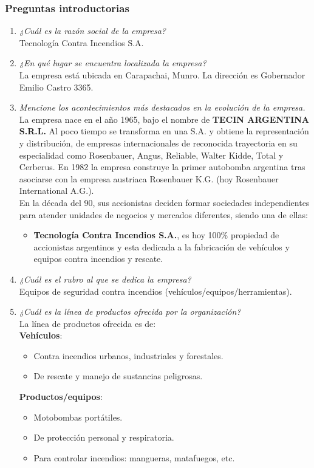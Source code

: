 \documentclass[a4paper,10pt]{article}
\begin{document}
		\subsubsection{Preguntas introductorias}
			\begin{enumerate}
				\item \textit{¿Cuál es la razón social de la empresa?}\\
				Tecnología Contra Incendios S.A.
				
				\item \textit{¿En qué lugar se encuentra localizada la empresa?}\\
				La empresa está ubicada en Carapachai, Munro. La dirección es Gobernador Emilio Castro 3365.			
				
				\item \textit{Mencione los acontecimientos más destacados en la evolución de la empresa.}\\
				La empresa nace en el año 1965, bajo el nombre de \textbf{TECIN ARGENTINA S.R.L.} Al poco tiempo se transforma en una S.A. y obtiene la representación y distribución, de empresas internacionales de reconocida trayectoria en su especialidad como Rosenbauer, Angus, Reliable, Walter Kidde, Total y Cerberus. En 1982 la empresa construye la primer autobomba argentina tras asociarse con la empresa austriaca Rosenbauer K.G. (hoy Rosenbauer International A.G.).\\
				En la década del 90, sus accionistas deciden formar sociedades independientes para atender unidades de negocios y mercados diferentes, siendo una de ellas: 
				\begin{itemize}
					\item \textbf{Tecnología Contra Incendios S.A.}, es hoy 100\% propiedad de accionistas argentinos y esta dedicada a la fabricación de vehículos y equipos contra incendios y rescate.
				\end{itemize}
				\item \textit{¿Cuál es el rubro al que se dedica la empresa?}\\
				Equipos de seguridad contra incendios (vehículos/equipos/herramientas).
			
				\item \textit{¿Cuál es la línea de productos ofrecida por la organización?}\\	
				La línea de productos ofrecida es de:\\
				\textbf{Vehículos}:
				\begin{itemize}
					\item Contra incendios urbanos, industriales y forestales.
					\item De rescate y manejo de sustancias peligrosas.
				\end{itemize}
				\textbf{Productos/equipos}:
				\begin{itemize}
					\item Motobombas portátiles.
					\item De protección personal y respiratoria.
					\item Para controlar incendios: mangueras, matafuegos, etc.
				\end{itemize}	
												

\end{enumerate}
\end{document}
